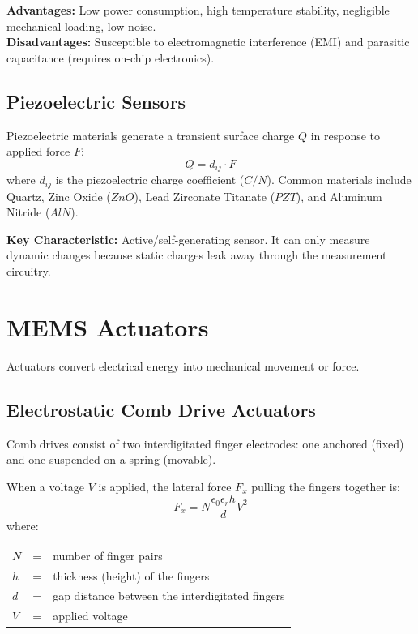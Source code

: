 \documentclass[12pt,a4paper]{article}
\begin{document}
\textbf{Advantages:} Low power consumption, high temperature stability, negligible mechanical loading, low noise. \\
\textbf{Disadvantages:} Susceptible to electromagnetic interference (EMI) and parasitic capacitance (requires on-chip electronics).

\subsection{Piezoelectric Sensors}
Piezoelectric materials generate a transient surface charge $Q$ in response to applied force $F$:
$$Q = d_{ij} \cdot F$$
where $d_{ij}$ is the piezoelectric charge coefficient ($C/N$). Common materials include Quartz, Zinc Oxide ($ZnO$), Lead Zirconate Titanate ($PZT$), and Aluminum Nitride ($AlN$).

\textbf{Key Characteristic:} Active/self-generating sensor. It can only measure dynamic changes because static charges leak away through the measurement circuitry.

\section{MEMS Actuators}

Actuators convert electrical energy into mechanical movement or force.

\subsection{Electrostatic Comb Drive Actuators}
Comb drives consist of two interdigitated finger electrodes: one anchored (fixed) and one suspended on a spring (movable).

\begin{tcolorbox}[formulabox, title={Comb Drive Lateral Actuation Force}]
When a voltage $V$ is applied, the lateral force $F_x$ pulling the fingers together is:
$$F_x = N \frac{\epsilon_0 \epsilon_r h}{d} V^2$$
where:
\begin{tabular}{lcl}
$N$ & = & number of finger pairs \\
$h$ & = & thickness (height) of the fingers \\
$d$ & = & gap distance between the interdigitated fingers \\
$V$ & = & applied voltage
\end{tabular}
\end{tcolorbox}
\end{document}
